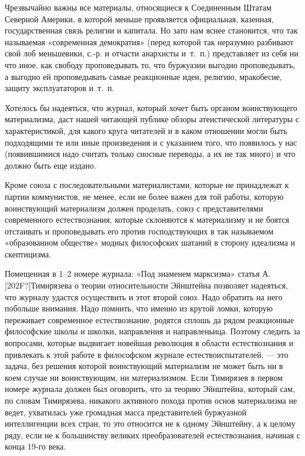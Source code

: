 Чрезвычайно важны все материалы, относящиеся к Соединенным Штатам Северной
Америки, в которой меньше проявляется официальная, казенная,
государственная связь религии и капитала. Но зато нам яснее становится, что
так называемая «современная демократия» (перед которой так неразумно
разбивают свой лоб меньшевики, с.-р. и отчасти анархисты и~т.~п.)
представляет из себя ни что иное, как свободу проповедывать то, что
буржуазии выгодно проповедывать, а выгодно ей проповедывать самые
реакционные идеи, религию, мракобесие, защиту эксплуататоров и~т.~п.

Хотелось бы надеяться, что журнал, который хочет быть органом воинствующего
материализма, даст нашей читающей публике обзоры атеистической литературы с
характеристикой, для какого круга читателей и в каком отношении могли быть
подходящими те или иные произведения и с указанием того, что появилось у
нас (появившимися надо считать только сносные переводы, а их не так много)
и что должно быть еще издано.

Кроме союза с последовательными материалистами, которые не принадлежат к
партии коммунистов, не менее, если не более важен для той работы, которую
воинствующий материализм должен проделать, союз с представителями
современного естествознания, которые склоняются к материализму и не боятся
отстаивать и проповедывать его против господствующих в так называемом
«образованном обществе» модных философских шатаний в сторону идеализма и
скептицизма.

Помещенная в 1–2 номере журнала: «Под знаменем марксизма» статья
А.\textlatin{[202F?]}Тимирязева о теории относительности Эйнштейна
позволяет надеяться, что журналу удастся осуществить и этот второй союз.
Надо обратить на него побольше внимания. Надо помнить, что именно из крутой
ломки, которую переживает современное естествознание, родятся сплошь да
рядом реакционные философские школы и школки, направления и направленьица.
Поэтому следить за вопросами, которые выдвигает новейшая революция в
области естествознания и привлекать к этой работе в философском журнале
естествоиспытателей, — это задача, без решения которой воинствующий
материализм не может быть ни в коем случае ни воинствующим, ни
материализмом. Если Тимирязев в первом номере журнала должен был оговорить,
что за теорию Эйнштейна, который сам, по словам Тимирязева, никакого
активного похода против основ материализма не ведет, ухватилась уже
громадная масса представителей буржуазной интеллигенции всех стран, то это
относится не к одному Эйнштейну, а к целому ряду, если не к большинству
великих преобразователей естествознания, начиная с конца 19-го века.

